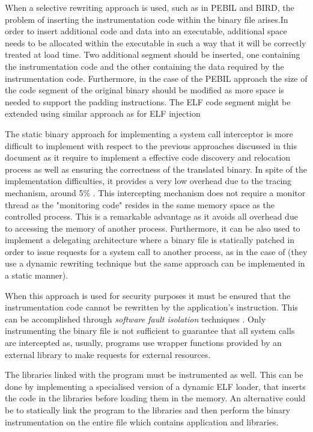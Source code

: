 When a selective rewriting approach is used, such as in PEBIL and BIRD, the problem of inserting the instrumentation code within the binary file arises.In order to insert  additional code and data into an executable, additional space needs to be allocated within the executable in such a way that it will be correctly treated at load time. Two additional segment should be inserted, one containing the instrumentation code and the other containing the data required by the instrumentation code. Furthermore, in the case of the PEBIL approach the size of the code segment of the original binary should be modified as more space is needed to support the padding instructions. The ELF code segment might be extended using similar approach as for ELF injection \cite{ELF_inj}


The static binary approach for implementing a system call interceptor is more difficult to implement with respect to the previous approaches discussed in this document as it require to implement a effective code discovery and relocation process  as well as ensuring the correctness of the translated binary. In spite of the implementation difficulties, it provides a very low overhead due to the tracing mechanism, around 5\% \cite{PEBIL}. This intercepting mechanism does not require a monitor thread as the "monitoring code" resides in the same memory space as the controlled process. This is a remarkable advantage as it avoids all overhead due to accessing the memory of another process. Furthermore, it can be also used to implement a delegating architecture where a binary file is statically patched in order to issue requests for a system call to another process, as in the case of \cite{seccompsandbox,vx32} (they use a dynamic rewriting technique but the same approach can be implemented in a static manner). 

When this approach is used for security purposes  it must be ensured that the instrumentation code cannot be rewritten by the application's instruction. This can be accomplished through \emph{software fault isolation} techniques \cite{sfi}. Only instrumenting the binary file is not sufficient to guarantee that all system calls are intercepted as, usually, programs use  wrapper functions provided by an external library to make requests for external resources. 

The libraries linked with the program must be instrumented as well. This can be done by implementing a specialised version of a dynamic ELF loader, that inserts the code in the libraries before loading them in the memory. An alternative could be to statically link the program to the libraries and then perform the binary instrumentation on the entire file which contains application and libraries.        




